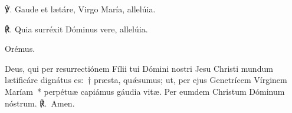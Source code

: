 ℣. Gaude et lætáre, Virgo María, allelúia.

℟. Quia surréxit Dóminus vere, allelúia.

Orémus.

\noindent Deus, qui per resurrectiónem Fílii tui Dómini nostri Jesu Christi mundum lætificáre dignátus es:~† præsta, quǽsumus; ut, per ejus Genetrícem Vírginem Maríam~* perpétuæ capiámus gáudia vitæ. Per eumdem Christum Dóminum nóstrum.  ℟.~Amen.